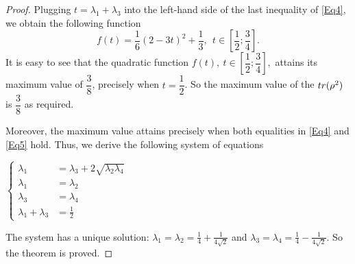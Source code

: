 \documentclass[10pt,a4paper]{amsart}
\begin{document}
\begin{proof}
	Plugging $t = \lambda_1 + \lambda_3$ into the left-hand side of the last inequality of \eqref{Eq4},  we obtain the following function $$f(t) = \frac{1}{6}(2-3t)^2 + \frac{1}{3},\ \ t \in \left[\dfrac{1}{2};\dfrac{3}{4}\right].$$
	It is easy to see that the quadratic function $f(t),\ t \in \left[\dfrac{1}{2};\dfrac{3}{4}\right],$ attains its maximum value  of $\dfrac{3}{8}$, precisely when $t = \dfrac{1}{2}$. So the maximum value of the ${\rm tr}(\rho^2)$ is $\dfrac{3}{8}$ as required.
	
	Moreover, the maximum value attains precisely when both equalities in \eqref{Eq4} and \eqref{Eq5} hold. Thus, we derive the following system of equations  
	\begin{center}
		$\begin{cases}
			\lambda_1 &= \lambda_3+ 2 \sqrt{\lambda_2\lambda_4}\\
			\lambda_1 &= \lambda_2\\
			\lambda_3 &=\lambda_4\\
			\lambda_1 + \lambda_3 &= \frac{1}{2}
		\end{cases}$  
	\end{center}  
	The system has a unique solution:    
	$\lambda_1 = \lambda_2 = \frac{1}{4} + \frac{1}{4\sqrt{2}}$ and $\lambda_3 = \lambda_4 = \frac{1}{4} - \frac{1}{4\sqrt{2}}.$ So the theorem is proved.
	
\end{proof}
\end{document}
